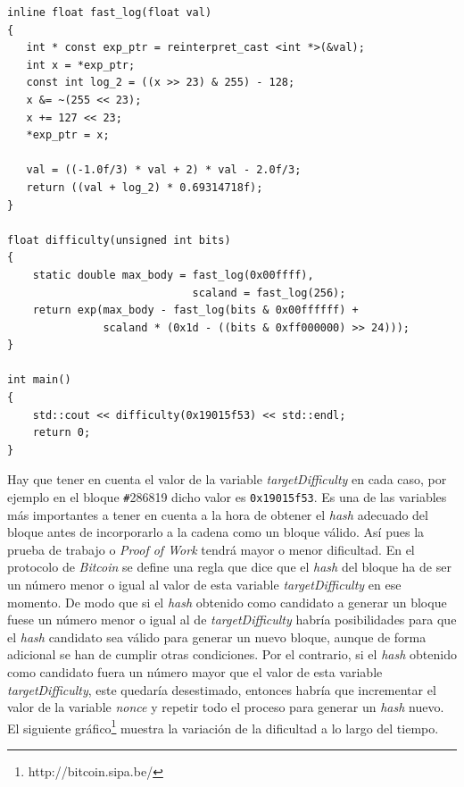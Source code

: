 \documentclass{article}
\begin{document}
\begin{enumerate}
\begin{verbatim}
inline float fast_log(float val)
{
   int * const exp_ptr = reinterpret_cast <int *>(&val);
   int x = *exp_ptr;
   const int log_2 = ((x >> 23) & 255) - 128;
   x &= ~(255 << 23);
   x += 127 << 23;
   *exp_ptr = x;

   val = ((-1.0f/3) * val + 2) * val - 2.0f/3;
   return ((val + log_2) * 0.69314718f);
}

float difficulty(unsigned int bits)
{
    static double max_body = fast_log(0x00ffff),
                             scaland = fast_log(256);
    return exp(max_body - fast_log(bits & 0x00ffffff) +
               scaland * (0x1d - ((bits & 0xff000000) >> 24)));
}

int main()
{
    std::cout << difficulty(0x19015f53) << std::endl;
    return 0;
}
        \end{verbatim}
        
        Hay que tener en cuenta el valor de la variable \textit{targetDifficulty} en cada caso, por ejemplo en el bloque \texttt{\#}286819 dicho valor es \texttt{0x19015f53}. Es una de las variables más importantes a tener en cuenta a la hora de obtener el \textit{hash} adecuado del bloque antes de incorporarlo a la cadena como un bloque válido. Así pues la prueba de trabajo o \textit{Proof of Work} tendrá mayor o menor dificultad. En el protocolo de \textit{Bitcoin} se define una regla que dice que el \textit{hash} del bloque ha de ser un número menor o igual al valor de esta variable \textit{targetDifficulty} en ese momento. De modo que si el \textit{hash} obtenido como candidato a generar un bloque fuese un número menor o igual al de \textit{targetDifficulty} habría posibilidades para que el \textit{hash} candidato sea válido para generar un nuevo bloque, aunque de forma adicional se han de cumplir otras condiciones. Por el contrario, si el \textit{hash} obtenido como candidato fuera un número mayor que el valor de esta variable \textit{targetDifficulty}, este quedaría desestimado, entonces habría que incrementar el valor de la variable \textit{nonce} y repetir todo el proceso para generar un \textit{hash} nuevo. El siguiente gráfico\footnote{http://bitcoin.sipa.be/} muestra la variación de la dificultad a lo largo del tiempo.
        

\end{enumerate}
\end{document}
